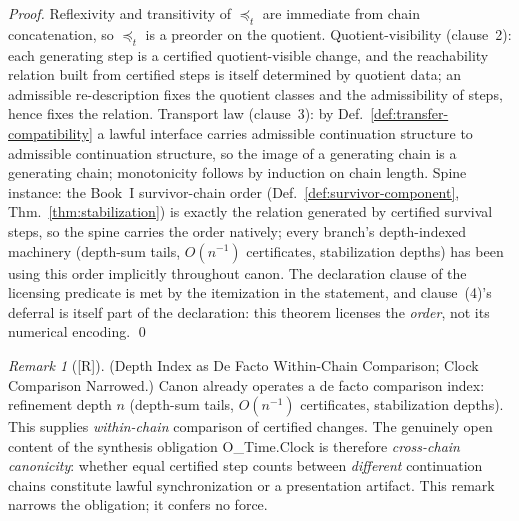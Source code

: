 \documentclass[12pt,oneside]{amsbook}
\theoremstyle{plain}
\theoremstyle{definition}
\theoremstyle{remark}
\newtheorem{remark}[theorem]{Remark}
\newcommand{\status}[1]{\textup{[#1]}}
\begin{document}
\begin{proof}
Reflexivity and transitivity of $\preceq_t$ are immediate from
chain concatenation, so $\preceq_t$ is a preorder on the quotient.
Quotient-visibility (clause~2): each generating step is a certified
quotient-visible change, and the reachability relation built from
certified steps is itself determined by quotient data; an
admissible re-description fixes the quotient classes and the
admissibility of steps, hence fixes the relation.  Transport law
(clause~3): by Def.~\ref{def:transfer-compatibility} a lawful
interface carries admissible continuation structure to admissible
continuation structure, so the image of a generating chain is a
generating chain; monotonicity follows by induction on chain
length.  Spine instance: the Book~I survivor-chain order
(Def.~\ref{def:survivor-component}, Thm.~\ref{thm:stabilization})
is exactly the relation generated by certified survival steps, so
the spine carries the order natively; every branch's depth-indexed
machinery (depth-sum tails, $O(n^{-1})$ certificates, stabilization
depths) has been using this order implicitly throughout canon.
The declaration clause of the licensing predicate is met by the
itemization in the statement, and clause~(4)'s deferral is itself
part of the declaration: this theorem licenses the \emph{order},
not its numerical encoding. \qed
\end{proof}

\begin{remark}[\status{R}]\label{rmk:vrp-time-depth-index}
\textup{(Depth Index as De Facto Within-Chain Comparison; Clock
Comparison Narrowed.)}
Canon already operates a de facto comparison index: refinement
depth $n$ (depth-sum tails, $O(n^{-1})$ certificates, stabilization
depths).  This supplies \emph{within-chain} comparison of certified
changes.  The genuinely open content of the synthesis obligation
O\_Time.Clock is therefore \emph{cross-chain canonicity}: whether
equal certified step counts between \emph{different} continuation
chains constitute lawful synchronization or a presentation
artifact.  This remark narrows the obligation; it confers no
force.
\end{remark}
\end{document}
